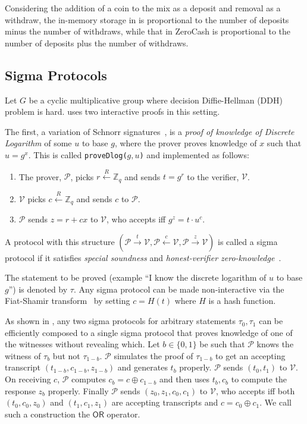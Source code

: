 \documentclass[runningheads]{llncs}
\newcommand{\ornode}{\ensuremath{\mathsf{OR}}}
\begin{document}
Considering the addition of a coin to the mix as a deposit and removal as a withdraw, the in-memory storage in \algname is proportional to the number of deposits minus the number of withdraws, while that in ZeroCash is proportional to the number of deposits plus the number of withdraws.  

\subsection{Sigma Protocols} 

Let $G$ be a cyclic multiplicative group where decision Diffie-Hellman (DDH) problem is hard. 
\algname uses two interactive proofs in this setting. 

The first, a variation of Schnorr signatures~\cite{Sch91}, is a {\em proof of knowledge of Discrete Logarithm} of some $u$ to base $g$, where the prover proves knowledge of $x$ such that $u = g^x$. This is called \texttt{proveDlog($g, u$)} and implemented as follows:
\begin{enumerate}
	\item The prover, $\mathcal{P}$, picks $r \stackrel{R}{\leftarrow} \mathbb{Z}_q$ and sends $t = g^r$ to the verifier, $\mathcal{V}$.
	\item $\mathcal{V}$ picks $c \stackrel{R}{\leftarrow} \mathbb{Z}_q$ and sends $c$ to $\mathcal{P}$.
	\item $\mathcal{P}$ sends $z = r + cx$ to $\mathcal{V}$, who accepts iff ${g}^z = t\cdot {u}^c$. 
	
\end{enumerate}

A protocol with this structure $(\mathcal{P} \stackrel{t}{\rightarrow}\mathcal{V}, \mathcal{P} \stackrel{c}{\leftarrow}\mathcal{V}, \mathcal{P} \stackrel{z}{\rightarrow}\mathcal{V})$ is called a sigma protocol if it satisfies {\em special soundness} and {\em honest-verifier zero-knowledge}~\cite{Dam10}. 

The statement to be proved (example ``I know the discrete logarithm of $u$ to base $g$'') is denoted by $\tau$.
Any sigma protocol can be made non-interactive via the Fiat-Shamir transform~\cite{fiatshamir} by setting $c= H(t)$ where $H$ is a hash function. 

As shown in \cite{CDS94}, any two sigma protocols for arbitrary statements $\tau_0, \tau_1$ can be efficiently composed to a single sigma protocol that proves knowledge of one of the witnesses without revealing which. Let $b \in \{0, 1\}$ be such that $\mathcal{P}$ knows the witness of $\tau_{b}$ but not $\tau_{1-b}$. 
$\mathcal{P}$ simulates the proof of $\tau_{1-b}$ to get an accepting transcript $(t_{1-b}, c_{1-b}, z_{1-b})$ and generates $t_b$ properly. $\mathcal{P}$ sends $(t_0, t_1)$ to $\mathcal{V}$. On receiving $c$, $\mathcal{P}$ computes $c_b = c \oplus c_{1-b}$ and then uses $t_b, c_b$ to compute the response $z_b$ properly. Finally $\mathcal{P}$ sends $(z_0, z_1, c_0, c_1)$ to $\mathcal{V}$, who accepts iff both $(t_0, c_0, z_0)$ and $(t_1, c_1, z_1)$ are accepting transcripts and $c = c_0 \oplus c_1$.
We call such a construction the $\ornode$ operator. 
\end{document}
